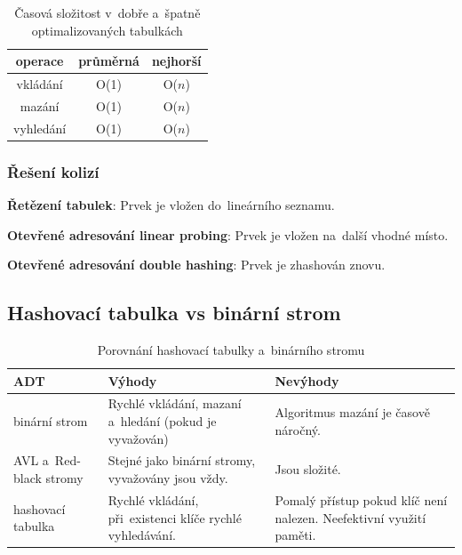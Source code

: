 \begin{table}[ht]
	\centering
	\caption{Časová složitost v~dobře a~špatně optimalizovaných tabulkách}
	\begin{tabular}{|c||c|c|}\hline
		operace   & průměrná & nejhorší   \\\hline\hline
		vkládání  & O(1)     & O(\( n \)) \\\hline
		mazání    & O(1)     & O(\( n \)) \\\hline
		vyhledání & O(1)     & O(\( n \)) \\\hline
	\end{tabular}
\end{table}

\subsubsection{Řešení kolizí}

\textbf{Řetězení tabulek}: Prvek je vložen do~lineárního seznamu.

\textbf{Otevřené adresování linear probing}: Prvek je vložen na~další vhodné místo.

\textbf{Otevřené adresování double hashing}: Prvek je zhashován znovu.

\subsection{Hashovací tabulka vs binární strom}

\begin{table}[ht]
	\caption{Porovnání hashovací tabulky a~binárního stromu}
	\begin{tabularx}{\textwidth}{|l||X|X|}\hline
		ADT                    & Výhody                                                   & Nevýhody                                                            \\\hline\hline
		binární strom          & Rychlé vkládání, mazaní a~hledání (pokud je vyvažován)   & Algoritmus mazání je časově náročný.                                \\\hline
		AVL a~Red-black stromy & Stejné jako binární stromy, vyvažovány jsou vždy.        & Jsou složité.                                                       \\\hline
		hashovací tabulka      & Rychlé vkládání, při~existenci klíče rychlé vyhledávání. & Pomalý přístup pokud klíč není nalezen. Neefektivní využití paměti. \\\hline
	\end{tabularx}
\end{table}

